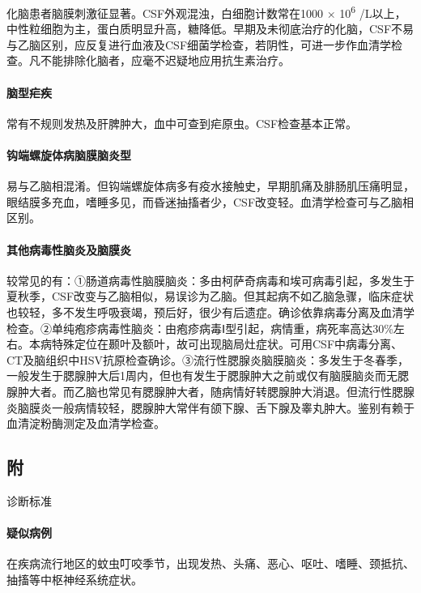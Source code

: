 化脑患者脑膜刺激征显著。CSF外观混浊，白细胞计数常在1000 ×
10\textsuperscript{6}
/L以上，中性粒细胞为主，蛋白质明显升高，糖降低。早期及未彻底治疗的化脑，CSF不易与乙脑区别，应反复进行血液及CSF细菌学检查，若阴性，可进一步作血清学检查。凡不能排除化脑者，应毫不迟疑地应用抗生素治疗。

\paragraph{脑型疟疾}

常有不规则发热及肝脾肿大，血中可查到疟原虫。CSF检查基本正常。

\paragraph{钩端螺旋体病脑膜脑炎型}

易与乙脑相混淆。但钩端螺旋体病多有疫水接触史，早期肌痛及腓肠肌压痛明显，眼结膜多充血，嗜睡多见，而昏迷抽搐者少，CSF改变轻。血清学检查可与乙脑相区别。

\paragraph{其他病毒性脑炎及脑膜炎}

较常见的有：①肠道病毒性脑膜脑炎：多由柯萨奇病毒和埃可病毒引起，多发生于夏秋季，CSF改变与乙脑相似，易误诊为乙脑。但其起病不如乙脑急骤，临床症状也较轻，多不发生呼吸衰竭，预后好，很少有后遗症。确诊依靠病毒分离及血清学检查。②单纯疱疹病毒性脑炎：由疱疹病毒Ⅰ型引起，病情重，病死率高达30\%左右。本病特殊定位在颞叶及额叶，故可出现脑局灶症状。可用CSF中病毒分离、CT及脑组织中HSV抗原检查确诊。③流行性腮腺炎脑膜脑炎：多发生于冬春季，一般发生于腮腺肿大后1周内，但也有发生于腮腺肿大之前或仅有脑膜脑炎而无腮腺肿大者。而乙脑也常见有腮腺肿大者，随病情好转腮腺肿大消退。但流行性腮腺炎脑膜炎一般病情较轻，腮腺肿大常伴有颌下腺、舌下腺及睾丸肿大。鉴别有赖于血清淀粉酶测定及血清学检查。

\subsection{附} 诊断标准

\paragraph{疑似病例}

在疾病流行地区的蚊虫叮咬季节，出现发热、头痛、恶心、呕吐、嗜睡、颈抵抗、抽搐等中枢神经系统症状。

